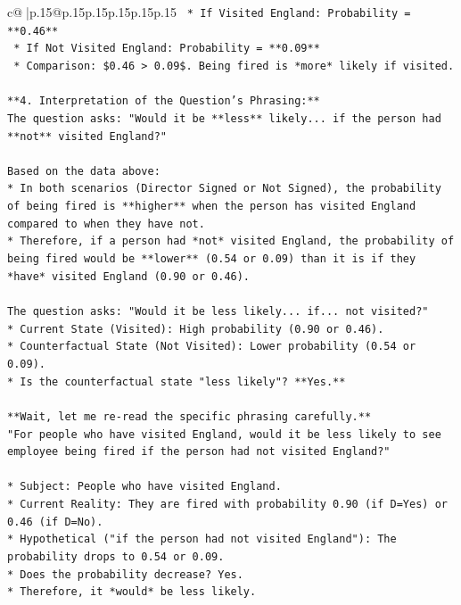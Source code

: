 \documentclass{article}
\begin{document}
{\begin{supertabular}{c@{$\;$}|p{.15\linewidth}@{}p{.15\linewidth}p{.15\linewidth}p{.15\linewidth}p{.15\linewidth}p{.15\linewidth}}
{{{\texttt{    *   If Visited England: Probability = **0.46**} \\
\texttt{    *   If Not Visited England: Probability = **0.09**} \\
\texttt{    *   Comparison: \$0.46 > 0.09\$. Being fired is *more* likely if visited.} \\
\\ 
\texttt{**4. Interpretation of the Question's Phrasing:**} \\
\texttt{The question asks: "Would it be **less** likely... if the person had **not** visited England?"} \\
\\ 
\texttt{Based on the data above:} \\
\texttt{*   In both scenarios (Director Signed or Not Signed), the probability of being fired is **higher** when the person has visited England compared to when they have not.} \\
\texttt{*   Therefore, if a person had *not* visited England, the probability of being fired would be **lower** (0.54 or 0.09) than it is if they *have* visited England (0.90 or 0.46).} \\
\\ 
\texttt{The question asks: "Would it be less likely... if... not visited?"} \\
\texttt{*   Current State (Visited): High probability (0.90 or 0.46).} \\
\texttt{*   Counterfactual State (Not Visited): Lower probability (0.54 or 0.09).} \\
\texttt{*   Is the counterfactual state "less likely"? **Yes.**} \\
\\ 
\texttt{**Wait, let me re{-}read the specific phrasing carefully.**} \\
\texttt{"For people who have visited England, would it be less likely to see employee being fired if the person had not visited England?"} \\
\\ 
\texttt{*   Subject: People who have visited England.} \\
\texttt{*   Current Reality: They are fired with probability 0.90 (if D=Yes) or 0.46 (if D=No).} \\
\texttt{*   Hypothetical ("if the person had not visited England"): The probability drops to 0.54 or 0.09.} \\
\texttt{*   Does the probability decrease? Yes.} \\
\texttt{*   Therefore, it *would* be less likely.} \\
}}}
\end{supertabular}}
\end{document}
